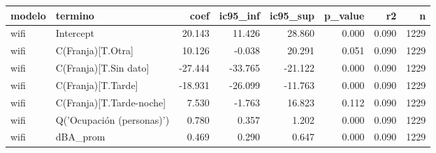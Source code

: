 \begin{tabular}{llrrrrrr}
\toprule
modelo & termino & coef & ic95\_inf & ic95\_sup & p\_value & r2 & n \\
\midrule
wifi & Intercept & 20.143 & 11.426 & 28.860 & 0.000 & 0.090 & 1229 \\
wifi & C(Franja)[T.Otra] & 10.126 & -0.038 & 20.291 & 0.051 & 0.090 & 1229 \\
wifi & C(Franja)[T.Sin dato] & -27.444 & -33.765 & -21.122 & 0.000 & 0.090 & 1229 \\
wifi & C(Franja)[T.Tarde] & -18.931 & -26.099 & -11.763 & 0.000 & 0.090 & 1229 \\
wifi & C(Franja)[T.Tarde-noche] & 7.530 & -1.763 & 16.823 & 0.112 & 0.090 & 1229 \\
wifi & Q('Ocupación (personas)') & 0.780 & 0.357 & 1.202 & 0.000 & 0.090 & 1229 \\
wifi & dBA\_prom & 0.469 & 0.290 & 0.647 & 0.000 & 0.090 & 1229 \\
\bottomrule
\end{tabular}
